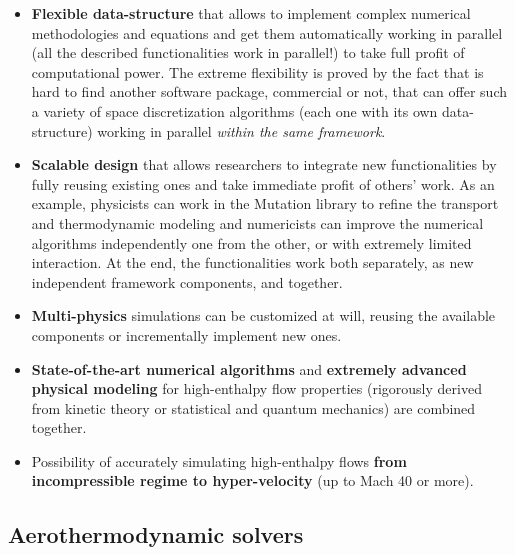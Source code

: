 \documentclass[11pt]{article}
\begin{document}
\begin{itemize}
\item
  {\bf Flexible data-structure} that allows to implement 
  complex numerical methodologies and equations and get them 
  automatically working in parallel (all the described functionalities
  work in parallel!) to take full profit of computational power.
  The extreme flexibility is proved by the fact that is hard to find
  another software package, commercial or not, that can offer such 
  a variety of space discretization algorithms (each one with
  its own data-structure) working in parallel {\it within the same framework}.
\item
  {\bf Scalable design} that allows researchers to integrate new
  functionalities by fully reusing existing ones and take immediate 
  profit of others' work. As an example, physicists can work in 
  the Mutation library to refine the transport and thermodynamic 
  modeling and numericists can improve the numerical algorithms
  independently one from the other, or with extremely limited 
  interaction. At the end, the functionalities work
  both separately, as new independent framework components, and together.
\item
  {\bf Multi-physics} simulations can be customized at will, reusing the
  available components or incrementally implement new ones. 
\item
  {\bf State-of-the-art numerical algorithms} and {\bf extremely advanced
    physical modeling} for high-enthalpy flow properties (rigorously
  derived from kinetic theory or statistical and quantum mechanics)
  are combined together. 
\item
  Possibility of accurately simulating high-enthalpy flows {\bf from
    incompressible regime to hyper-velocity} (up to Mach 40 or more).
\end{itemize}

\subsection*{Aerothermodynamic solvers}
\end{document}
